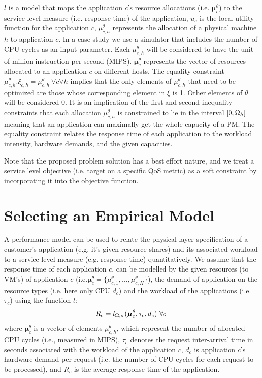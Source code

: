 $l$ is a model that maps the application $c$'s resource allocations (i.e. $\boldsymbol\mu^\theta_{c}$) to the service level measure (i.e. response time) of the application, $u_c$ is the local utility function for the application $c$, $\mu^\theta_{c,h}$ represents the allocation of a physical machine $h$ to application $c$. 
In a case study we use a simulator that includes the number of CPU cycles as an input parameter. Each $\mu^\theta_{c,h}$ will be considered to have the unit of million instruction per-second (MIPS). $\boldsymbol\mu^\theta_{c}$ represents the vector of resources allocated to an application $c$ on different hosts. 
The equality constraint $\mu^\theta_{c,h}.\xi_{c,h}=\mu^\theta_{c,h} \  \forall c \forall h$ implies that the only elements of $\mu^\theta_{c,h}$ that need to be optimized are those whose corresponding element in $\xi$ is 1. Other elements of $\theta$ will be considered 0. It is an implication of the first and second inequality constraints that each allocation $\mu^\theta_{c,h}$ is constrained to lie in the interval $[0,\Omega_h]$ meaning that an application can maximally get the whole capacity of a PM. The equality constraint relates the response time of each application to the workload intensity, hardware demands, and the given capacities.

Note that the proposed problem solution has a best effort nature, and we treat a service level objective (i.e. target on a specific QoS metric) as a soft constraint by incorporating it into the objective function. 

\section{Selecting an Empirical Model}
A performance model can be used to relate the physical layer specification of a customer's application (e.g. it's given resource shares) and its associated workload to a service level measure (e.g. response time) quantitatively.    
We assume that the response time of each application $c$, can be modelled by the given resources (to VM's) of application $c$ (i.e.$\boldsymbol\mu^\theta_{c}=\{\mu^\theta_{c,1},\dots ,\mu^\theta_{c,H}\}$), the demand of application on the resource types (i.e. here only CPU $d_c$) and the workload of the applications (i.e. $\tau_c$) using the function $l$:
\begin{equation} \label{eq:perf-model_general}
\begin{split}
	R_c=l_{\Omega,\sigma}(\boldsymbol\mu^\theta_{c} ,\tau_c,d_{c}) & \  \forall c \\
	\end{split}
\end{equation} 
 where $\boldsymbol\mu^\theta_{c}$ is a vector of elements $\mu^\theta_{c,h}$, which represent the number of allocated CPU cycles (i.e., measured in MIPS), ${\tau }_c$ denotes the request inter-arrival time in seconds associated with the workload of the application $c$, $d_c$ is application $c$'s hardware demand per request (i.e. the number of CPU cycles for each request to be processed), and $R_c$ is the average response time of the application.

